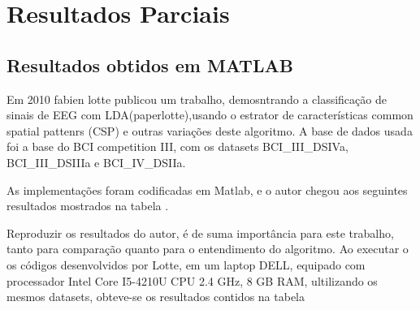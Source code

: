 \chapter[Resultados Parcias ]{Resultados Parciais}

\section{Resultados obtidos em MATLAB}
Em 2010 fabien lotte publicou um trabalho, demosntrando a classificação de sinais de EEG com LDA(paperlotte),usando o estrator de características common spatial pattenrs (CSP) e outras
variações deste algoritmo. A base de dados usada foi a base do BCI competition III, com os datasets BCI\_III\_DSIVa, BCI\_III\_DSIIIa e BCI\_IV\_DSIIa. 

As implementações foram codificadas em Matlab, e o autor chegou aos seguintes resultados mostrados na tabela .

 
Reproduzir os resultados do autor, é de suma importância para este trabalho, tanto para comparação quanto para o entendimento do algoritmo. Ao executar o os códigos desenvolvidos por Lotte, em um laptop DELL, equipado com processador Intel Core I5-4210U CPU 2.4 GHz, 8 GB RAM, ultilizando os mesmos datasets, obteve-se os resultados contidos na tabela

